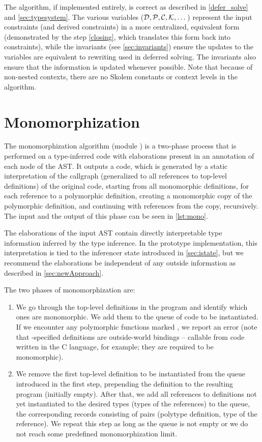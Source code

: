 The algorithm, if implemented entirely, is correct as described in \cref{defer_solve} and \cref{sec:typesystem}. The various variables ($\mathcal D, \mathcal P, \mathcal C, \mathcal K, \dots$) represent the input constraints (and derived constraints) in a more centralized, equivalent form (demonstrated by the step \ref{closing}, which translates this form back into constraints), while the invariants (see \cref{sec:invariants}) ensure the updates to the variables are equivalent to rewriting used in deferred solving. The invariants also ensure that the information is updated whenever possible. Note that because of non-nested contexts, there are no Skolem constants or context levels in the algorithm.

\section{Monomorphization}
\label{sec:mono}

The monomorphization algorithm (module ) is a two-phase process that is performed on a type-inferred code with elaborations present in an annotation of each node of the AST. It outputs a code, which is generated by a static interpretation of the callgraph (generalized to all references to top-level definitions) of the original code, starting from all monomorphic definitions, for each reference to a polymorphic definition, creating a monomorphic copy of the polymorphic definition, and continuing with references from the copy, recursively. The input and the output of this phase can be seen in \cref{lst:mono}.

The elaborations of the input AST contain directly interpretable type information inferred by the type inference. In the prototype implementation, this interpretation is tied to the inferencer state introduced in \cref{sec:istate}, but we recommend the elaborations be independent of any outside information as described in \cref{sec:newApproach}.

The two phases of monomorphization are:

\begin{enumerate}
    \item We go through the top-level definitions in the program and identify which ones are monomorphic. We add them to the queue of code to be instantiated. If we encounter any polymorphic functions marked , we report an error (note that -specified definitions are outside-world bindings -- callable from code written in the C language, for example; they are required to be monomorphic).

    \item We remove the first top-level definition to be instantiated from the queue introduced in the first step, prepending the definition to the resulting program (initially empty). After that, we add all references to definitions not yet instantiated to the desired types (types of the references) to the queue, the corresponding records consisting of pairs (polytype definition, type of the reference). We repeat this step as long as the queue is not empty or we do not reach some predefined monomorphization limit. \label{steptwo}
\end{enumerate}

